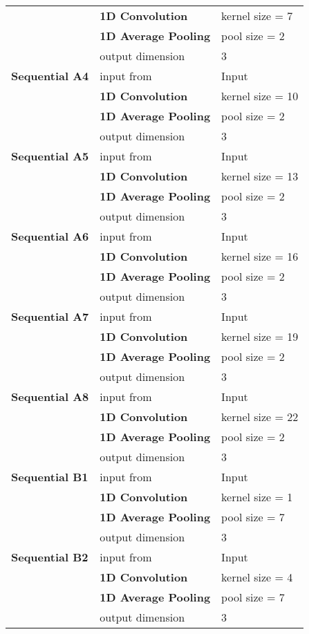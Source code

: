 \begin{tabularx}{\textwidth}[!h]{X X X}
	& \textbf{1D Convolution} & kernel size = 7\\
	& \textbf{1D Average Pooling} & pool size = 2\\
	& output dimension & 3\\
	[8pt]
	\textbf{Sequential A4} & input from & Input\\
	& \textbf{1D Convolution} & kernel size = 10\\
	& \textbf{1D Average Pooling} & pool size = 2\\
	& output dimension & 3\\
	[8pt]
	\textbf{Sequential A5} & input from & Input\\
	& \textbf{1D Convolution} & kernel size = 13\\
	& \textbf{1D Average Pooling} & pool size = 2\\
	& output dimension & 3\\
	[8pt]
	\textbf{Sequential A6} & input from & Input\\
	& \textbf{1D Convolution} & kernel size = 16\\
	& \textbf{1D Average Pooling} & pool size = 2\\
	& output dimension & 3\\
	[8pt]
	\textbf{Sequential A7} & input from & Input\\
	& \textbf{1D Convolution} & kernel size = 19\\
	& \textbf{1D Average Pooling} & pool size = 2\\
	& output dimension & 3\\
	[8pt]
	\textbf{Sequential A8} & input from & Input\\
	& \textbf{1D Convolution} & kernel size = 22\\
	& \textbf{1D Average Pooling} & pool size = 2\\
	& output dimension & 3\\
	[8pt]
	\textbf{Sequential B1} & input from & Input\\
	& \textbf{1D Convolution} & kernel size = 1\\
	& \textbf{1D Average Pooling} & pool size = 7\\
	& output dimension & 3\\
	[8pt]
	\textbf{Sequential B2} & input from & Input\\
	& \textbf{1D Convolution} & kernel size = 4\\
	& \textbf{1D Average Pooling} & pool size = 7\\
	& output dimension & 3\\
	[8pt]

\end{tabularx}
